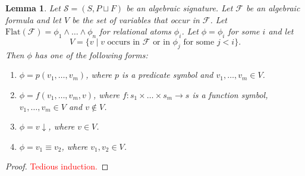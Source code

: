 \documentclass[a4paper]{article}
\newcommand{\todo}[1]{\textcolor{red}{#1}}
\newtheorem{lemma}[theorem]{Lemma}
\theoremstyle{remark}
\theoremstyle{definition}
\begin{document}
\begin{lemma}
  \label{lem:flattening-atoms}
  Let $\mathcal{S} = (S, P \sqcup F)$ be an algebraic signature.
  Let $\mathcal{F}$ be an algebraic formula and let $V$ be the set of variables that occur in $\mathcal{F}$.
  Let $\mathrm{Flat}(\mathcal{F}) = \phi_1 \land \dots \land \phi_n$ for relational atoms $\phi_i$.
  Let $\phi = \phi_i$ for some $i$ and let
  \begin{equation}
    V = \{ v \mid v \text{ occurs in } \mathcal{F} \text{ or in } \phi_j \text{ for some } j < i \}.
  \end{equation}
  Then $\phi$ has one of the following forms:
  \begin{enumerate}
    \item
      \label{itm:flattened-predicate-case}
      $\phi = p(v_1, \dots, v_m)$, where $p$ is a predicate symbol and $v_1, \dots, v_m \in V$.
    \item
      \label{itm:flattened-function-case}
      $\phi = f(v_1, \dots, v_m, v)$, where $f : s_1 \times \dots \times s_m \rightarrow s$ is a function symbol, $v_1, \dots, v_m \in V$ and $v \notin V$.
    \item
      \label{itm:flattened-defined-case}
      $\phi = v \downarrow$, where $v \in V$.
    \item
      \label{itm:flattened-equals-case}
      $\phi = v_1 \equiv v_2$, where $v_1, v_2 \in V$.
  \end{enumerate}
\end{lemma}
\begin{proof}
  \todo{Tedious induction.}
\end{proof}
\end{document}

